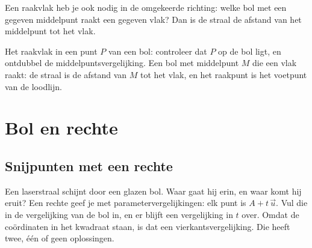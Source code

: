 Een raakvlak heb je ook nodig in de omgekeerde richting: welke bol met een gegeven middelpunt raakt een gegeven vlak? Dan is de straal de afstand van het middelpunt tot het vlak.


\begin{werkwijze}
Het raakvlak in een punt $P$ van een bol: controleer dat $P$ op de bol ligt, en ontdubbel de middelpuntsvergelijking. Een bol met middelpunt $M$ die een vlak raakt: de straal is de afstand van $M$ tot het vlak, en het raakpunt is het voetpunt van de loodlijn.
\end{werkwijze}


\begin{oefeningen}

\end{oefeningen}

\section{Bol en rechte}

\subsection{Snijpunten met een rechte}

Een laserstraal schijnt door een glazen bol. Waar gaat hij erin, en waar komt hij eruit? Een rechte geef je met parametervergelijkingen: elk punt is $A + t\,\vec u$. Vul die in de vergelijking van de bol in, en er blijft een vergelijking in $t$ over. Omdat de coördinaten in het kwadraat staan, is dat een vierkantsvergelijking. Die heeft twee, één of geen oplossingen.


